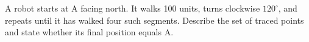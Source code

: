 A robot starts at A facing north. It walks 100 units, turns clockwise $120^\circ$, and repeats until it has walked four such segments. Describe the set of traced points and state whether its final position equals A.
